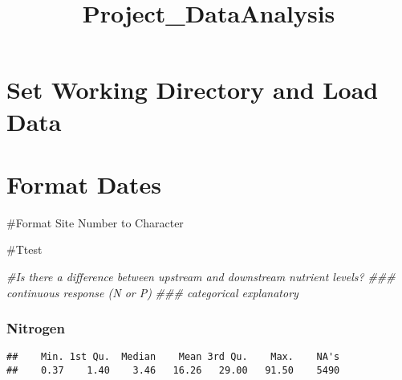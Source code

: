\documentclass[]{article}
\title{Project\_DataAnalysis}
\author{}
\date{}
\newenvironment{Shaded}{\begin{snugshade}}{\end{snugshade}}
\newcommand{\CommentTok}[1]{\textcolor[rgb]{0.56,0.35,0.01}{\textit{#1}}}
\newcommand{\KeywordTok}[1]{\textcolor[rgb]{0.13,0.29,0.53}{\textbf{#1}}}
\newcommand{\NormalTok}[1]{#1}
\newcommand{\OperatorTok}[1]{\textcolor[rgb]{0.81,0.36,0.00}{\textbf{#1}}}
\begin{document}
\maketitle

\hypertarget{set-working-directory-and-load-data}{%
\section{Set Working Directory and Load
Data}\label{set-working-directory-and-load-data}}

\hypertarget{format-dates}{%
\section{Format Dates}\label{format-dates}}

\#Format Site Number to Character

\#Ttest

\begin{Shaded}
\begin{Highlighting}[]
\CommentTok{#Is there a difference between upstream and downstream nutrient levels? }
\CommentTok{### continuous response (N or P)}
\CommentTok{### categorical explanatory}
\end{Highlighting}
\end{Shaded}

\hypertarget{nitrogen}{%
\subsubsection{Nitrogen}\label{nitrogen}}

\begin{Shaded}
\end{Shaded}

\begin{verbatim}
##    Min. 1st Qu.  Median    Mean 3rd Qu.    Max.    NA's 
##    0.37    1.40    3.46   16.26   29.00   91.50    5490
\end{verbatim}

\begin{Shaded}
\end{Shaded}
\end{document}
